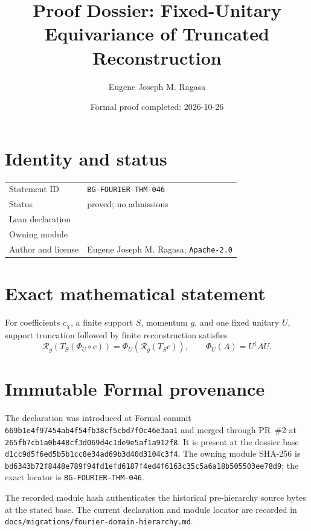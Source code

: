 \documentclass[11pt]{article}
\title{Proof Dossier: Fixed-Unitary Equivariance of Truncated Reconstruction}
\author{Eugene Joseph M. Ragasa}
\date{Formal proof completed: 2026-10-26}
\begin{document}
\raggedright
\maketitle

\section{Identity and status}
\begin{tabularx}{\textwidth}{@{}lY@{}}
\toprule
Statement ID & \texttt{BG-FOURIER-THM-046} \\
Status & proved; no admissions \\
Lean declaration &  \\
Owning module &  \\
Author and license & Eugene Joseph M. Ragasa; \texttt{Apache-2.0} \\
\bottomrule
\end{tabularx}

\section{Exact mathematical statement}
For coefficients $c_\chi$, a finite support $S$, momentum $g$, and one fixed unitary $U$, support truncation followed by finite reconstruction satisfies
\[
 \mathcal R_g\!\left(T_S(\Phi_U\circ c)\right)
 =\Phi_U\!\left(\mathcal R_g(T_Sc)\right),
 \qquad \Phi_U(A)=U^{\dagger}AU.
\]

\section{Immutable Formal provenance}
The declaration was introduced at Formal commit
\texttt{669b1e4f97454ab4f54fb38cf5cbd7f0c46e3aa1} and merged through PR~\#2 at
\texttt{265fb7cb1a0b448cf3d069d4c1de9e5af1a912f8}.  It is present at the dossier base
\texttt{d1cc9d5f6ed5b5b1cc8e34ad69b3d40d3104c3f4}.  The owning module SHA-256 is
\texttt{bd6343b72f8448e789f94fd1efd6187f4ed4f6163c35c5a6a18b505503ee78d9}; the exact locator is \texttt{BG-FOURIER-THM-046}.

The recorded module hash authenticates the historical pre-hierarchy source bytes at the stated base. The current declaration and module locator are recorded in \texttt{docs/migrations/fourier-domain-hierarchy.md}.
\end{document}
